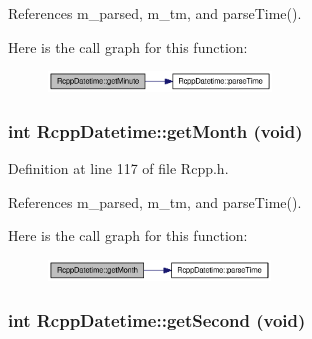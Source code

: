 References m\_\-parsed, m\_\-tm, and parseTime().

Here is the call graph for this function:\nopagebreak
\begin{figure}[H]
\begin{center}
\leavevmode
\includegraphics[width=168pt]{classRcppDatetime_db41bd524ead66d69e129b1f2767358a_cgraph}
\end{center}
\end{figure}
\hypertarget{classRcppDatetime_a7f04947d2a27e4bba2d19efa21771ed}{
\subsubsection[{getMonth}]{\setlength{\rightskip}{0pt plus 5cm}int RcppDatetime::getMonth (void)}}
\label{classRcppDatetime_a7f04947d2a27e4bba2d19efa21771ed}




Definition at line 117 of file Rcpp.h.

References m\_\-parsed, m\_\-tm, and parseTime().

Here is the call graph for this function:\nopagebreak
\begin{figure}[H]
\begin{center}
\leavevmode
\includegraphics[width=167pt]{classRcppDatetime_a7f04947d2a27e4bba2d19efa21771ed_cgraph}
\end{center}
\end{figure}
\hypertarget{classRcppDatetime_2feb900005890d183cc5f6a626c4d614}{
\subsubsection[{getSecond}]{\setlength{\rightskip}{0pt plus 5cm}int RcppDatetime::getSecond (void)}}
\label{classRcppDatetime_2feb900005890d183cc5f6a626c4d614}




